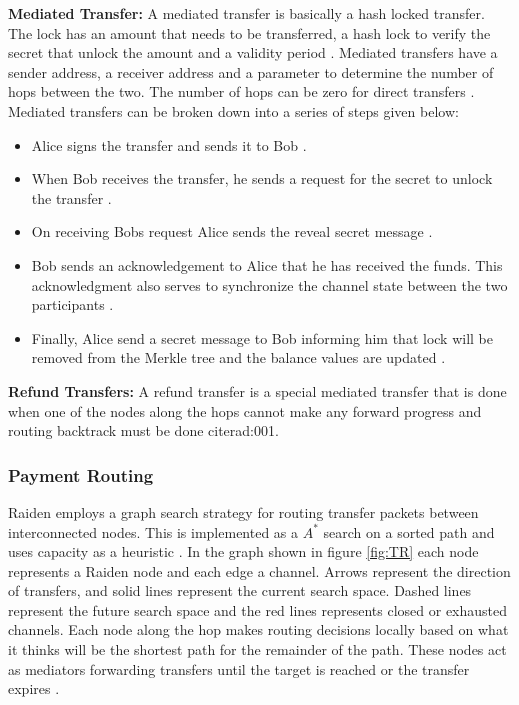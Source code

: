 \textbf{Mediated Transfer:} A mediated transfer is basically a hash locked transfer. The lock has an amount that needs to be transferred, a hash lock to verify the secret that unlock the amount and a validity period \cite{rad:001}. Mediated transfers have a sender address, a receiver address and a parameter to determine the number of hops between the two. The number of hops can be zero for direct transfers \cite{rad:001}. Mediated transfers can be broken down into a series of steps given below:
\begin{itemize}

\item Alice signs the transfer and sends it to Bob \cite{rad:001}.
\item When Bob receives the transfer, he sends a request for the secret to unlock the transfer \cite{rad:001}.
\item On receiving Bobs request Alice sends the reveal secret message \cite{rad:001}.
\item Bob sends an acknowledgement to Alice that he has received the funds. This acknowledgment also serves to synchronize the channel state between the two participants \cite{rad:001}.
\item Finally, Alice send a secret message to Bob informing him that lock will be removed from the Merkle tree and the balance values are updated \cite{rad:001}. 
\end{itemize}

\textbf{Refund Transfers:} A refund transfer is a special mediated transfer that is done when one of the nodes along the hops cannot make any forward progress and routing backtrack must be done cite{rad:001}.  
\vspace{0.5cm}	
\subsubsection{Payment Routing} \label{NP}	
Raiden employs a graph search strategy for routing transfer packets between interconnected nodes. This is implemented as a $A^*$ search on a sorted path and uses capacity as a heuristic \cite{rad:001}.  In the graph shown in figure \ref{fig:TR} each node represents a Raiden node and each edge a channel. Arrows represent the direction of transfers, and solid lines represent the current search space. Dashed lines represent the future search space and the red lines represents closed or exhausted channels. Each node along the hop makes routing decisions locally based on what it thinks will be the shortest path for the remainder of the path. These nodes act as mediators forwarding transfers until the target is reached or the transfer expires \cite{rad:001}.

